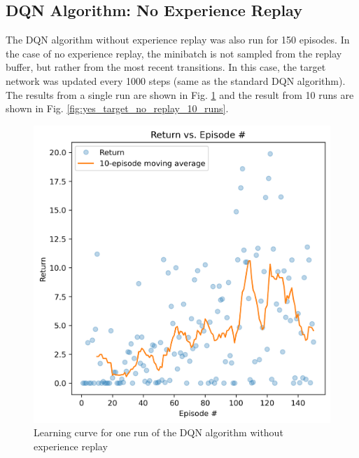 \documentclass[conference]{IEEEtran}
\begin{document}
\newpage
\subsection{DQN Algorithm: No Experience Replay}
The DQN algorithm without experience replay was also run for 150 episodes. In the case of no experience replay, the minibatch is not sampled from the replay buffer, but rather from the most recent transitions. In this case, the target network was updated every 1000 steps (same as the standard DQN algorithm). The results from a single run are shown in Fig. \ref{fig:yes_target_no_replay_one_run} and the result from 10 runs are shown in Fig. \ref{fig:yes_target_no_replay_10_runs}.

\begin{figure}[h]
\centering
\includegraphics[width=0.94\linewidth]{../figures/yes_target_no_replay/return_150_1000.png}
\caption{Learning curve for one run of the DQN algorithm without experience replay}
\label{fig:yes_target_no_replay_one_run}
\end{figure}
\end{document}

